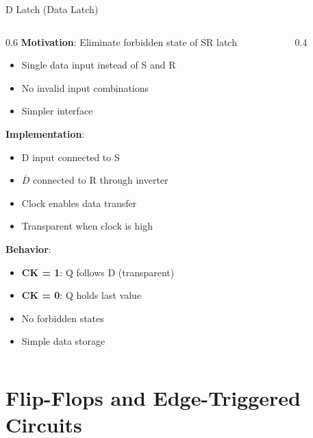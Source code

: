 \documentclass[aspectratio=169,11pt]{beamer}
\newcommand{\concept}[1]{\textbf{\color{accentcolor}#1}}
\begin{document}
\begin{frame}{D Latch (Data Latch)}
\begin{columns}
\begin{column}{0.6\textwidth}
\concept{Motivation}: Eliminate forbidden state of SR latch
\begin{itemize}
\item Single data input instead of S and R
\item No invalid input combinations
\item Simpler interface
\end{itemize}
\vspace{0.3cm}
\concept{Implementation}:
\begin{itemize}
\item D input connected to S
\item $\overline{D}$ connected to R through inverter
\item Clock enables data transfer
\item Transparent when clock is high
\end{itemize}
\vspace{0.3cm}
\concept{Behavior}:
\begin{itemize}
\item \textbf{CK = 1}: Q follows D (transparent)
\item \textbf{CK = 0}: Q holds last value
\item No forbidden states
\item Simple data storage
\end{itemize}
\end{column}
\begin{column}{0.4\textwidth}
\begin{center}

\end{center}
\end{column}
\end{columns}
\end{frame}

\section{Flip-Flops and Edge-Triggered Circuits}
\end{document}
